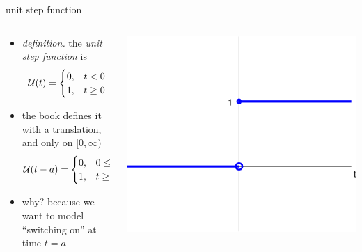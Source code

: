 \documentclass[urlcolor=blue,dvipsnames]{beamer}
\begin{document}
\begin{frame}{unit step function}

\begin{columns}
\begin{column}{0.65\textwidth}
\begin{itemize}
\item \emph{definition.}  the \emph{unit step function} is
    $$\mathcal{U}(t) = \begin{cases} 0, & t < 0 \\
                             1, & t \ge 0 \end{cases}$$
\item the book defines it with a translation, and only on $[0,\infty)$
    $$\mathcal{U}(t-a) = \begin{cases} 0, & 0\le t < a \\
                               1, & t \ge a \end{cases}$$
\item why? because we want to model ``switching on'' at time $t=a$
\end{itemize}
\end{column}
\begin{column}{0.35\textwidth}
\includegraphics[width=\textwidth]{figs/unitstep}


\end{column}
\end{columns}
\end{frame}
\end{document}
